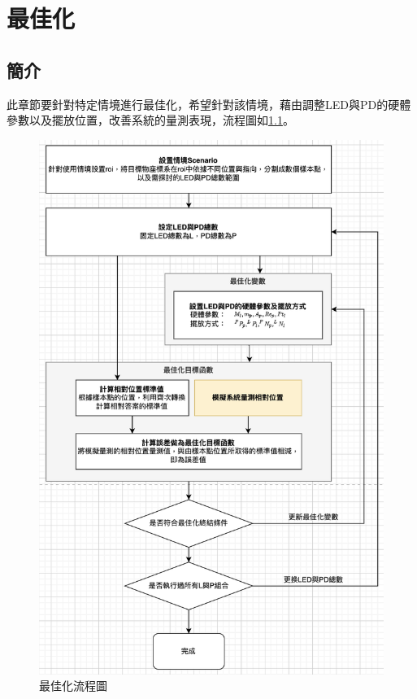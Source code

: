 \chapter{最佳化}

\section{簡介}

此章節要針對特定情境進行最佳化，希望針對該情境，藉由調整LED與PD的硬體參數以及擺放位置，改善系統的量測表現，流程圖如\ref{flow:opt}。

\begin{figure}[ht]
    \centering
    \includegraphics[width=13cm]{ch4pic/flowchart_opt.png}
    \caption{最佳化流程圖}
    \label{flow:opt}
\end{figure}

